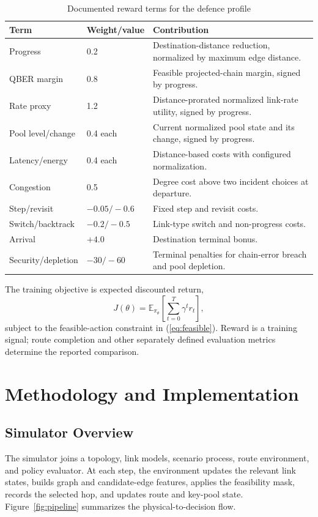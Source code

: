 \documentclass[12pt,a4paper,oneside]{report}
\begin{document}
\begin{table}[htbp]
\centering
\caption{Documented reward terms for the defence profile}
\label{tab:reward}
\small
\begin{tabular}{@{}p{1.3in}p{0.9in}p{3.6in}@{}}
\toprule
Term & Weight/value & Contribution \\
\midrule
Progress & 0.2 & Destination-distance reduction, normalized by maximum edge distance. \\
QBER margin & 0.8 & Feasible projected-chain margin, signed by progress. \\
Rate proxy & 1.2 & Distance-prorated normalized link-rate utility, signed by progress. \\
Pool level/change & 0.4 each & Current normalized pool state and its change, signed by progress. \\
Latency/energy & 0.4 each & Distance-based costs with configured normalization. \\
Congestion & 0.5 & Degree cost above two incident choices at departure. \\
Step/revisit & $-0.05/-0.6$ & Fixed step and revisit costs. \\
Switch/backtrack & $-0.2/-0.5$ & Link-type switch and non-progress costs. \\
Arrival & $+4.0$ & Destination terminal bonus. \\
Security/depletion & $-30/-60$ & Terminal penalties for chain-error breach and pool depletion. \\
\bottomrule
\end{tabular}
\end{table}

The training objective is expected discounted return,
\begin{equation}
J(\theta)=\mathbb{E}_{\pi_\theta}\left[\sum_{t=0}^{T}\gamma^t r_t\right],
\label{eq:objective}
\end{equation}
subject to the feasible-action constraint in (\ref{eq:feasible}). Reward is a training signal; route completion and other separately defined evaluation metrics determine the reported comparison.

\chapter{Methodology and Implementation}

\section{Simulator Overview}
The simulator joins a topology, link models, scenario process, route environment, and policy evaluator. At each step, the environment updates the relevant link states, builds graph and candidate-edge features, applies the feasibility mask, records the selected hop, and updates route and key-pool state. Figure~\ref{fig:pipeline} summarizes the physical-to-decision flow.
\end{document}
